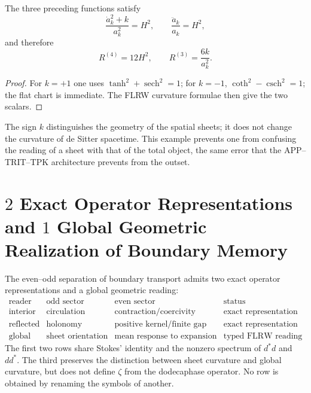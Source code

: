 \begin{proposition}
\label{prop:tres-foliaciones-rev6}
The three preceding functions satisfy
\[
 \frac{\dot a_k^2+k}{a_k^2}=H^2,\qquad
 \frac{\ddot a_k}{a_k}=H^2,
\]
and therefore
\[
 \boxed{\quad
 R^{(4)}=12H^2,\qquad
 R^{(3)}=\frac{6k}{a_k^2}.
 \quad}
\]
\end{proposition}

\begin{proof}
For \(k=+1\) one uses
\(\tanh^2+\operatorname{sech}^2=1\); for \(k=-1\),
\(\coth^2-\operatorname{csch}^2=1\); the flat chart is immediate.
The FLRW curvature formulae then give the two scalars.
\end{proof}

The sign \(k\) distinguishes the geometry of the spatial sheets; it does not change the
curvature of de Sitter spacetime.  This example prevents one from confusing
the reading of a sheet with that of the total object, the same error that the
APP--TRIT--TPK architecture prevents from the outset.

\section{\(2\) Exact Operator Representations and \(1\) Global Geometric Realization of Boundary Memory}

\begin{theorem}
\label{thm:una-memoria-tres-funciones}
The even--odd separation of boundary transport admits two
exact operator representations and a global geometric reading:
\[
\begin{array}{c|c|c|c}
\text{reader}&\text{odd sector}&\text{even sector}&\text{status}\\ \hline
\text{interior}&\text{circulation}&\text{contraction/coercivity}
&\text{exact representation}\\
\text{reflected}&\text{holonomy}&\text{positive kernel/finite gap}
&\text{exact representation}\\
\text{global}&\text{sheet orientation}&
                \text{mean response to expansion}
&\text{typed FLRW reading}
\end{array}
\]
The first two rows share Stokes' identity and the nonzero spectrum
of \(d^\ast d\) and \(dd^\ast\).  The third preserves the distinction between
sheet curvature and global curvature, but does not define \(\zeta\) from the
dodecaphase operator. No row is obtained by renaming the symbols of
another.
\end{theorem}

